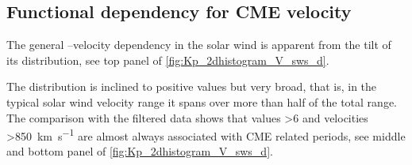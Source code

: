 \subsection{Functional dependency for CME velocity}
The general \Kp--velocity dependency in the solar wind is apparent from the tilt of its distribution, see top panel of \autoref{fig:Kp_2dhistogram_V_sws_d}.
\begin{figure}
\end{figure}
The distribution is inclined to positive values but very broad, that is, in the typical solar wind velocity range it spans over more than half of the total \Kp{} range. The comparison with the filtered data shows that \Kp{} values \num{>6} and velocities \SI{>850}{\km\per\s} are almost always associated with CME related periods, see middle and bottom panel of \autoref{fig:Kp_2dhistogram_V_sws_d}.

